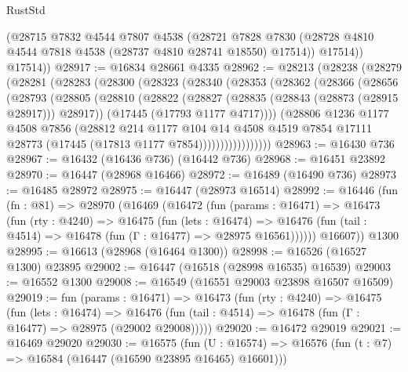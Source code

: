 \begin{lexlean}{RustStd}
\begin{coremodule}
{\begin{coremodule}
{{{{{{{{{{{{{{{{{{{{{{{{{{{{{{{{{{{{{{{{{{{{{{{{{{{{{{{          (@28715
            @7832
            @4544
            @7807
            @4538
            (@28721
              @7828
              @7830
              (@28728 @4810 @4544 @7818 @4538 (@28737 @4810 @28741 @18550) @17514))
            @17514))
        @17514))
@28917 := @16834 @28661 @4335
@28962 := @28213
    (@28238
      (@28279
        (@28281
          (@28283
            (@28300
              (@28323
                (@28340
                  (@28353
                    (@28362
                      (@28366
                        (@28656
                          (@28793
                            (@28805
                              (@28810
                                (@28822
                                  (@28827 (@28835 (@28843 (@28873 (@28915 @28917))) @28917))
                                  (@17445 (@17793 @1177 @4717))))
                              (@28806
                                @1236
                                @1177
                                @4508
                                @7856
                                (@28812
                                  @214
                                  @1177
                                  @104
                                  @14
                                  @4508
                                  @4519
                                  @7854
                                  @17111
                                  @28773
                                  (@17445 (@17813 @1177 @7854)))))))))))))))))
@28963 := @16430 @736
@28967 := @16432 (@16436 @736) (@16442 @736)
@28968 := @16451 @23892
@28970 := @16447 (@28968 @16466)
@28972 := @16489 (@16490 @736)
@28973 := @16485 @28972
@28975 := @16447 (@28973 @16514)
@28992 := @16446
    (fun (fn : @81) =>
    @28970
      (@16469
        (@16472
          (fun (params : @16471) =>
          @16473
            (fun (rty : @4240) =>
            @16475
              (fun (lets : @16474) =>
              @16476 (fun (tail : @4514) => @16478 (fun (Γ : @16477) => @28975 @16561))))))
        @16607))
    @1300
@28995 := @16613 (@28968 (@16464 @1300))
@28998 := @16526 (@16527 @1300) @23895
@29002 := @16447 (@16518 (@28998 @16535) @16539)
@29003 := @16552 @1300
@29008 := @16549 (@16551 @29003 @23898 @16507 @16509)
@29019 := fun (params : @16471) =>
  @16473
    (fun (rty : @4240) =>
    @16475
      (fun (lets : @16474) =>
      @16476 (fun (tail : @4514) => @16478 (fun (Γ : @16477) => @28975 (@29002 @29008)))))
@29020 := @16472 @29019
@29021 := @16469 @29020
@29030 := @16575
    (fun (U : @16574) => @16576 (fun (t : @7) => @16584 (@16447 (@16590 @23895 @16465) @16601)))
}}}}}}}}}}}}}}}}}}}}}}}}}}}}}}}}}}}}}}}}}}}}}}}}}}}}}}}
\end{coremodule}}
\end{coremodule}
\end{lexlean}
